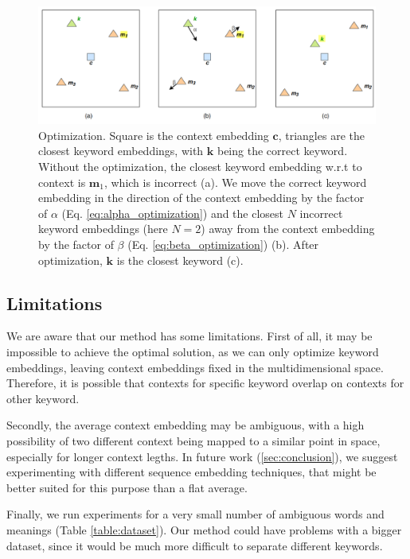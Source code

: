 \documentclass{llncs}
\begin{document}
\begin{figure}
    \centering
    \caption{Optimization. Square is the context embedding \(\bm{c}\), triangles are the closest keyword embeddings, with \(\bm{k}\) being the correct keyword. Without the optimization, the closest keyword embedding w.r.t to context is \(\bm{m}_{1}\), which is incorrect (a). We move the correct keyword embedding in the direction of the context embedding by the factor of \(\alpha\) (Eq. \ref{eq:alpha_optimization}) and the closest \(N\) incorrect keyword embeddings (here \(N=2\)) away from the context embedding by the factor of \(\beta\) (Eq. \ref{eq:beta_optimization}) (b). After optimization, \(\bm{k}\) is the closest keyword (c).}
    \label{fig:opt}
    \includegraphics[scale=0.31]{res/opt.png}
\end{figure}


\subsection{Limitations}
\label{sec:limitations}
We are aware that our method has some limitations.
First of all, it may be impossible to achieve the optimal solution, as we can only optimize keyword embeddings, leaving context embeddings fixed in the multidimensional space.
Therefore, it is possible that contexts for specific keyword overlap on contexts for other keyword.

Secondly, the average context embedding may be ambiguous, with a high possibility of two different context being mapped to a similar point in space, especially for longer context legths.
In future work (\ref{sec:conclusion}), we suggest experimenting with different sequence embedding techniques, that might be better suited for this purpose than a flat average.

Finally, we run experiments for a very small number of ambiguous words and meanings (Table \ref{table:dataset}). Our method could have problems with a bigger dataset, since it would be much more difficult to separate different keywords.
\end{document}
